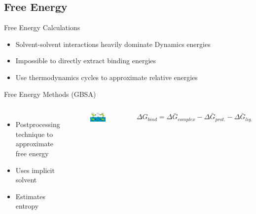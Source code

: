 \subsection{Free Energy}
\begin{frame}{Free Energy Calculations}
\begin{itemize}
	\item Solvent-solvent interactions heavily dominate Dynamics energies
	\vspace{1 cm}
	\item Impossible to directly extract binding energies
	\vspace{1 cm}
	\item Use thermodynamics cycles to approximate relative energies
\end{itemize}
\end{frame}

\begin{frame}{Free Energy Methods (GBSA)}
\begin{columns}
\begin{itemize}
		\item Postprocessing technique to approximate free energy
		\vspace{1 cm}
		\item Uses implicit solvent
		\vspace{1 cm}
		\item Estimates entropy
\end{itemize}
\begin{figure}
\includegraphics[width=0.95\textwidth]{../Graphics/Theory/gbsa}
\end{figure}
\begin{equation}
        \Delta G_{bind} = \Delta \bar{G}_{complex} - \Delta \bar{G}_{prot.} - \Delta \bar{G}_{lig.}
\end{equation}
\end{columns}
\end{frame}

